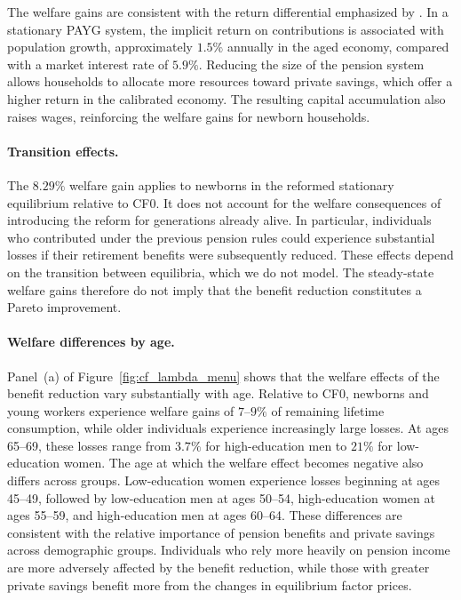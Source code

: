 \documentclass[12pt,a4paper]{article}
\begin{document}
The welfare gains are consistent with the return differential emphasized by \citet{Aaron1966}. In a stationary PAYG system, the implicit return on contributions is associated with population growth, approximately $1.5\%$ annually in the aged economy, compared with a market interest rate of $5.9\%$. Reducing the size of the pension system allows households to allocate more resources toward private savings, which offer a higher return in the calibrated economy. The resulting capital accumulation also raises wages, reinforcing the welfare gains for newborn households.

\paragraph{Transition effects.}
The $8.29\%$ welfare gain applies to newborns in the reformed stationary equilibrium relative to CF0. It does not account for the welfare consequences of introducing the reform for generations already alive. In particular, individuals who contributed under the previous pension rules could experience substantial losses if their retirement benefits were subsequently reduced. These effects depend on the transition between equilibria, which we do not model. The steady-state welfare gains therefore do not imply that the benefit reduction constitutes a Pareto improvement.

\paragraph{Welfare differences by age.}
Panel~(a) of Figure~\ref{fig:cf_lambda_menu} shows that the welfare effects of the benefit reduction vary substantially with age. Relative to CF0, newborns and young workers experience welfare gains of $7$--$9\%$ of remaining lifetime consumption, while older individuals experience increasingly large losses. At ages 65--69, these losses range from $3.7\%$ for high-education men to $21\%$ for low-education women. The age at which the welfare effect becomes negative also differs across groups. Low-education women experience losses beginning at ages 45--49, followed by low-education men at ages 50--54, high-education women at ages 55--59, and high-education men at ages 60--64. These differences are consistent with the relative importance of pension benefits and private savings across demographic groups. Individuals who rely more heavily on pension income are more adversely affected by the benefit reduction, while those with greater private savings benefit more from the changes in equilibrium factor prices.
\end{document}
